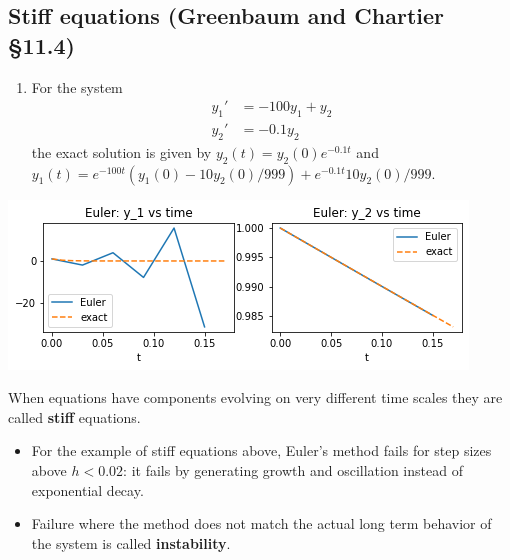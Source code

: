 \documentclass[12pt,letterpaper,noanswers]{exam}
\begin{document}
\subsection*{Stiff equations (Greenbaum and Chartier \S 11.4)}


\begin{enumerate}[resume]
\item For the system
\begin{align*}
    y_1' &=-100y_1+y_2 \\
    y_2' &= -0.1 y_2
\end{align*}
the exact solution is given by $y_2(t) = y_2(0)e^{-0.1t}$ and $y_1(t) = e^{-100t}(y_1(0) - 10y_2(0)/999)+e^{-0.1t}10y_2(0)/999$.
\end{enumerate}
\includegraphics{img/C19stiff.png}
\begin{tcolorbox}
When equations have components evolving on very different time scales they are called \textbf{stiff} equations.
\begin{itemize}
\itemsep0pt
    \item For the example of stiff equations above, Euler's method fails for step sizes above $h<0.02$: it fails by generating growth and oscillation instead of exponential decay.
    \item Failure where the method does not match the actual long term behavior of the system is called \textbf{instability}.
\end{itemize}
\end{tcolorbox}
\end{document}
